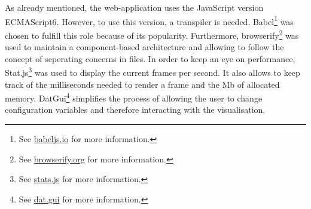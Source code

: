 As already mentioned, the web-application uses the JavaScript version ECMAScript6. However, to use this version, a transpiler is needed. Babel\footnote{See \href{https://babeljs.io/}{babeljs.io} for more information.} was chosen to fulfill this role because of its popularity. Furthermore, browserify\footnote{See \href{http://browserify.org/}{browserify.org} for more information.} was used to maintain a component-based architecture and allowing to follow the concept of seperating concerns in files.
In order to keep an eye on performance, Stat.js\footnote{See \href{https://github.com/mrdoob/stats.js/}{stats.js} for more information.} was used to display the current frames per second. It also allows to keep track of the milliseconds needed to render a frame and the \ac{Mb} of allocated memory. DatGui\footnote{See \href{https://github.com/dataarts/dat.gui}{dat.gui} for more information.} simplifies the process of allowing the user to change configuration variables and therefore interacting with the visualisation.
